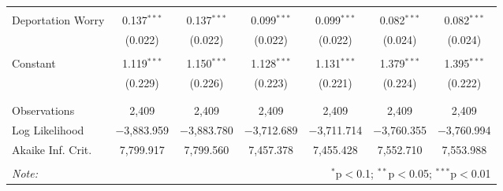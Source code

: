 \begin{table}[!htbp]
\begin{tabular}{@{\extracolsep{5pt}}lcccccc}
  & & & & & & \\ 
 Deportation Worry & 0.137$^{***}$ & 0.137$^{***}$ & 0.099$^{***}$ & 0.099$^{***}$ & 0.082$^{***}$ & 0.082$^{***}$ \\ 
  & (0.022) & (0.022) & (0.022) & (0.022) & (0.024) & (0.024) \\ 
  & & & & & & \\ 
 Constant & 1.119$^{***}$ & 1.150$^{***}$ & 1.128$^{***}$ & 1.131$^{***}$ & 1.379$^{***}$ & 1.395$^{***}$ \\ 
  & (0.229) & (0.226) & (0.223) & (0.221) & (0.224) & (0.222) \\ 
  & & & & & & \\ 
\hline \\[-1.8ex] 
Observations & 2,409 & 2,409 & 2,409 & 2,409 & 2,409 & 2,409 \\ 
Log Likelihood & $-$3,883.959 & $-$3,883.780 & $-$3,712.689 & $-$3,711.714 & $-$3,760.355 & $-$3,760.994 \\ 
Akaike Inf. Crit. & 7,799.917 & 7,799.560 & 7,457.378 & 7,455.428 & 7,552.710 & 7,553.988 \\ 
\hline 
\hline \\[-1.8ex] 
\textit{Note:}  & \multicolumn{6}{r}{$^{*}$p$<$0.1; $^{**}$p$<$0.05; $^{***}$p$<$0.01} \\ 
\end{tabular} 
\end{table} 
